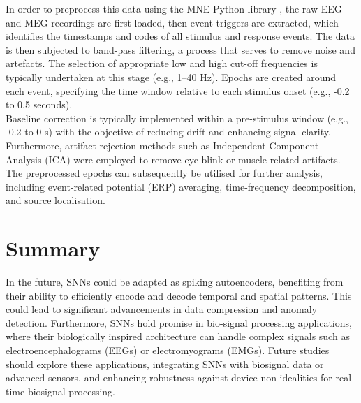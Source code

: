 \noindent In order to preprocess this data using the MNE-Python library \cite{gramfort2014mne}, the raw EEG and MEG recordings are first loaded, then event triggers are extracted, which identifies the timestamps and codes of all stimulus and response events. The data is then subjected to band-pass filtering, a process that serves to remove noise and artefacts. The selection of appropriate low and high cut-off frequencies is typically undertaken at this stage (e.g., 1–40 Hz). Epochs are created around each event, specifying the time window relative to each stimulus onset (e.g., -0.2 to 0.5 seconds).\\

\noindent Baseline correction is typically implemented within a pre-stimulus window (e.g., -0.2 to 0 s) with the objective of reducing drift and enhancing signal clarity. Furthermore, artifact rejection methods such as Independent Component Analysis (ICA) were employed to remove eye-blink or muscle-related artifacts. The preprocessed epochs can subsequently be utilised for further analysis, including event-related potential (ERP) averaging, time-frequency decomposition, and source localisation.\\

\section[Summary]{Summary}

In the future, SNNs could be adapted as spiking autoencoders, benefiting from their ability to efficiently encode and decode temporal and spatial patterns. This could lead to significant advancements in data compression and anomaly detection. Furthermore, SNNs hold promise in bio-signal processing applications, where their biologically inspired architecture can handle complex signals such as electroencephalograms (EEGs) or electromyograms (EMGs). Future studies should explore these applications, integrating SNNs with biosignal data or advanced sensors, and enhancing robustness against device non-idealities for real-time biosignal processing.\\
